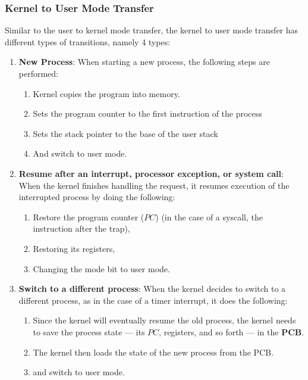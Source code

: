 \documentclass{article}
\begin{document}
\subsubsection{Kernel to User Mode Transfer}
Similar to the user to kernel mode transfer, the kernel to user mode transfer has different types of transitions, namely 4 types:

\begin{enumerate}
    \item \textbf{New Process}: When starting a new process, the following steps are performed:
          \begin{enumerate}
              \item Kernel copies the program into memory.
              \item Sets the program counter to the first instruction of the process
              \item Sets the stack pointer to the base of the user stack
              \item And switch   to user mode.
          \end{enumerate}
    \item \textbf{Resume after an interrupt, processor exception, or system call}: When the kernel finishes handling the request, it resumes execution of the interrupted process by doing the following:
          \begin{enumerate}
              \item Restore the program counter ($PC$) (in the case of a syscall, the instruction after the trap),
              \item Restoring its registers,
              \item Changing the mode bit to user mode.
          \end{enumerate}
    \item \textbf{Switch to a different process}: When the kernel decides to switch to a different process, as in the case of a timer interrupt, it does the following:
          \begin{enumerate}
              \item Since the kernel will eventually resume the old process, the kernel needs to save the process state --- its $PC$, registers, and so forth --- in the \textbf{PCB}.
              \item The kernel then loads the state of the new process from the PCB.
              \item and switch to user mode.
          \end{enumerate}

\end{enumerate}
\end{document}
